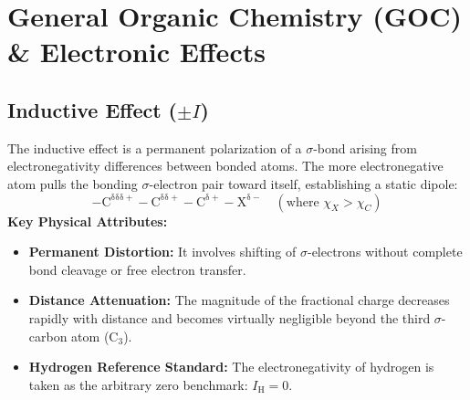 \documentclass[10pt,twoside,openright]{book}
\begin{document}
\section{General Organic Chemistry (GOC) \& Electronic Effects}

\subsection{Inductive Effect (\texorpdfstring{$\pm I$}{+-I})}

\begin{conceptbox}
The inductive effect is a permanent polarization of a $\sigma$-bond arising from electronegativity differences between bonded atoms. The more electronegative atom pulls the bonding $\sigma$-electron pair toward itself, establishing a static dipole:
\begin{equation}
  \mathrm{-C^{\delta\delta\delta+} - C^{\delta\delta+} - C^{\delta+} - X^{\delta-}} \quad (\text{where } \chi_X > \chi_C)
\end{equation}
\textbf{Key Physical Attributes:}
\begin{itemize}
  \item \textbf{Permanent Distortion:} It involves shifting of $\sigma$-electrons without complete bond cleavage or free electron transfer.
  \item \textbf{Distance Attenuation:} The magnitude of the fractional charge decreases rapidly with distance and becomes virtually negligible beyond the third $\sigma$-carbon atom ($\mathrm{C}_3$).
  \item \textbf{Hydrogen Reference Standard:} The electronegativity of hydrogen is taken as the arbitrary zero benchmark: $I_{\mathrm{H}} = 0$.
\end{itemize}
\end{conceptbox}
\end{document}
